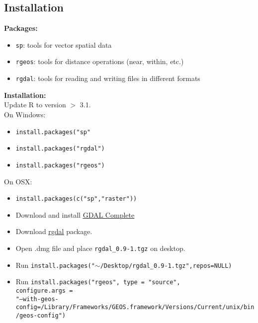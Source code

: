 \documentclass[10pt]{article}
\begin{document}
\hrulefill 	
\subsection*{Installation}
\textbf{Packages:}
\begin{itemize}
	\item \texttt{sp}: tools for vector spatial data
	\item \texttt{rgeos}: tools for distance operations (near, within, etc.)
	\item \texttt{rgdal}: tools for reading and writing files in different formats
\end{itemize}
\textbf{Installation:}\\
Update R to version $>$ 3.1.\\
On Windows:
\begin{itemize}
	\item \texttt{install.packages("sp"}
	\item \texttt{install.packages("rgdal")}
	\item \texttt{install.packages("rgeos")}
\end{itemize}
On OSX:
	\begin{itemize}
		\item \texttt{install.packages(c("sp","raster"))}
		\item Download and install 	\href{http://www.kyngchaos.com/files/software/frameworks/GDAL_Complete-1.11.dmg}{\underline{GDAL Complete}}
		\item Download \href{http://www.kyngchaos.com/files/software/frameworks/rgdal-0.9.1-1.dmg}{\underline{rgdal}} package. 
		\item Open .dmg file and place \texttt{rgdal\_0.9-1.tgz} on desktop.
		\item Run \texttt{install.packages("$\sim$/Desktop/rgdal\_0.9-1.tgz",repos=NULL)}
		\item Run \texttt{install.packages("rgeos", type = "source",} \\
		\texttt{configure.args =} \\
\texttt{"--with-geos-config=/Library/Frameworks/GEOS.framework/Versions/Current/unix/bin/geos-config")}
	\end{itemize}

\hrulefill
\end{document}
